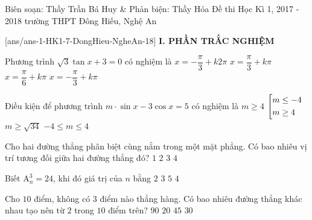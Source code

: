 	\begin{name}
{Biên soạn: Thầy Trần Bá Huy \& Phản biện: Thầy Hóa}
		{Đề thi Học Kì 1, 2017 - 2018 trường THPT Đông Hiếu, Nghệ An}
	\end{name}
	\setcounter{ex}{0}\setcounter{bt}{0}
	[ans/ans-1-HK1-7-DongHieu-NgheAn-18]
\noindent\textbf{I. PHẦN TRẮC NGHIỆM}


\begin{ex}%
Phương trình $\sqrt{3}\tan x+3=0$ có nghiệm là
\choice
{$x=-\dfrac{\pi}{3}+k2\pi$}
{$x=\dfrac{\pi}{3}+k\pi$}
{$x=\dfrac{\pi}{6}+k\pi$}
{\True $x=-\dfrac{\pi}{3}+k\pi$}
\end{ex}


\begin{ex}%
Điều kiện để phương trình $m\cdot\sin x-3\cos x=5$ có nghiệm là
\choice
{$m\geq 4$}
{\True $\left[\begin{aligned}& m\leq -4\\ &m\geq 4\end{aligned}\right.$}
{$m\geq \sqrt{34}$}
{$-4\leq m\leq 4$}
\end{ex}



\begin{ex}%
Cho hai đường thẳng phân biệt cùng nằm trong một mặt phẳng. Có bao nhiêu vị trí tương đối giữa hai đường thẳng đó?
\choice
{$1$}
{\True $2$}
{$3$}
{$4$}
\end{ex}


\begin{ex}%
Biết $\mathrm{A}_n^3=24$, khi đó giá trị của $n$ bằng
\choice
{$2$}
{$3$}
{$5$}
{\True $4$}
\end{ex}



\begin{ex}%
Cho $10$ điểm, không có $3$ điểm nào thẳng hàng. Có bao nhiêu đường thẳng khác nhau tạo nên từ $2$ trong $10$ điểm trên?
\choice
{$90$}
{$20$}
{\True $45$}
{$30$}
\end{ex}


